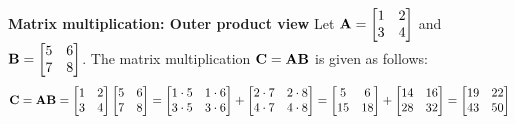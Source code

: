 \begin{boxedstuff}
    \begin{example}
        \textbf{Matrix multiplication: Outer product view} Let $\mf{A} = \bmx 1 & 2 \\ 3 & 4 \emx$ and $\mf{B} = \bmx 5 & 6 \\ 7 & 8 \emx$. The matrix multiplication $\mathbf{C} = \mathbf{A}\mathbf{B}$ is given as follows:
        \[ \mf{C} = \mf{A}\mf{B} = \bmxc 1 & 2 \\ 3 & 4 \emx \bmxc 5 & 6 \\ 7 & 8 \emx = \bmxc 1 \cdot 5 & 1 \cdot 6 \\ 3 \cdot 5 & 3 \cdot 6 \emx + \bmxc 2 \cdot 7 & 2 \cdot 8 \\ 4 \cdot 7 & 4 \cdot 8 \emx = \bmxc 5 & 6 \\ 15 & 18 \emx + \bmxc 14 & 16 \\ 28 & 32 \emx = \bmxc 19 & 22 \\ 43 & 50 \emx \]
        \label{example:ch02-mat-mult-outer-prod}
    \end{example}
\end{boxedstuff}